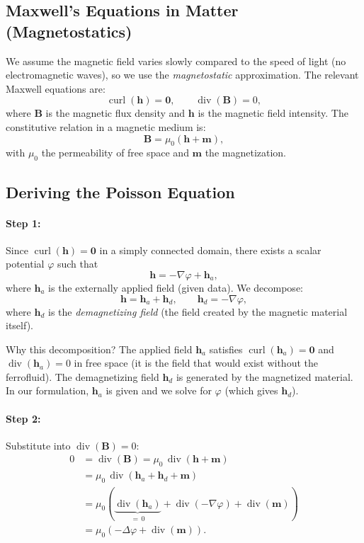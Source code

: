 \documentclass[11pt,a4paper]{article}
\theoremstyle{definition}
\theoremstyle{remark}
\newcommand{\dv}{\operatorname{div}}
\newcommand{\curl}{\operatorname{curl}}
\newcommand{\grad}{\nabla}
\newcommand{\bfm}{\bm{m}}
\newcommand{\bfh}{\bm{h}}
\newcommand{\bfB}{\bm{B}}
\begin{document}
\subsection{Maxwell's Equations in Matter (Magnetostatics)}

We assume the magnetic field varies slowly compared to the speed of
light (no electromagnetic waves), so we use the \emph{magnetostatic}
approximation. The relevant Maxwell equations are:
\begin{equation}
  \label{eq:maxwell}
  \curl(\bfh) = \bm{0}, \qquad
  \dv(\bfB) = 0,
\end{equation}
where $\bfB$ is the magnetic flux density and $\bfh$ is the magnetic
field intensity. The constitutive relation in a magnetic medium is:
\begin{equation}
  \label{eq:constitutive}
  \bfB = \mu_0(\bfh + \bfm),
\end{equation}
with $\mu_0$ the permeability of free space and $\bfm$ the magnetization.

\subsection{Deriving the Poisson Equation}

\paragraph{Step 1:} Since $\curl(\bfh) = \bm{0}$ in a simply connected
domain, there exists a scalar potential $\varphi$ such that
\begin{equation}
  \label{eq:h-grad-phi}
  \bfh = -\grad\varphi + \bfh_a,
\end{equation}
where $\bfh_a$ is the externally applied field (given data). We decompose:
\[
  \bfh = \bfh_a + \bfh_d, \qquad \bfh_d = -\grad\varphi,
\]
where $\bfh_d$ is the \emph{demagnetizing field} (the field created by
the magnetic material itself).

\begin{derivnote}
Why this decomposition? The applied field $\bfh_a$ satisfies
$\curl(\bfh_a) = \bm{0}$ and $\dv(\bfh_a) = 0$ in free space (it is
the field that would exist without the ferrofluid). The demagnetizing
field $\bfh_d$ is generated by the magnetized material. In our
formulation, $\bfh_a$ is given and we solve for $\varphi$ (which gives
$\bfh_d$).
\end{derivnote}

\paragraph{Step 2:} Substitute into $\dv(\bfB) = 0$:
\begin{align*}
  0 &= \dv(\bfB) = \mu_0\,\dv(\bfh + \bfm) \\
    &= \mu_0\,\dv(\bfh_a + \bfh_d + \bfm) \\
    &= \mu_0\left(\underbrace{\dv(\bfh_a)}_{=\,0}
       + \dv(-\grad\varphi) + \dv(\bfm)\right) \\
    &= \mu_0\left(-\Delta\varphi + \dv(\bfm)\right).
\end{align*}
\end{document}
